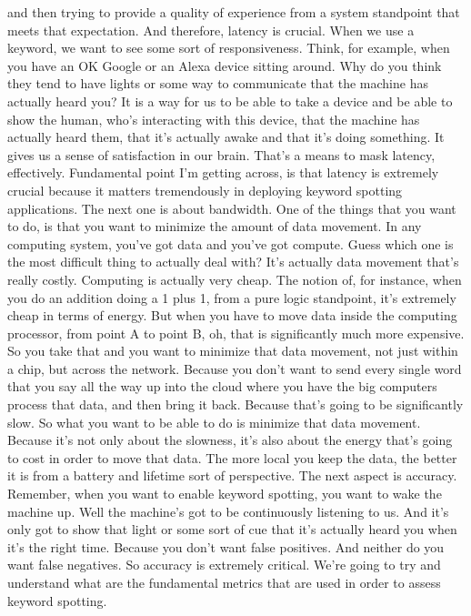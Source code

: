 and then trying to provide a quality of experience
from a system standpoint that meets that expectation.
And therefore, latency is crucial.
When we use a keyword, we want to see some sort of responsiveness.
Think, for example, when you have an OK Google or an Alexa device sitting around.
Why do you think they tend to have lights or some way
to communicate that the machine has actually heard you?
It is a way for us to be able to take a device
and be able to show the human, who's interacting with this device,
that the machine has actually heard them, that it's actually awake
and that it's doing something.
It gives us a sense of satisfaction in our brain.
That's a means to mask latency, effectively.
Fundamental point I'm getting across, is that latency is extremely crucial
because it matters tremendously in deploying
keyword spotting applications.
The next one is about bandwidth.
One of the things that you want to do, is
that you want to minimize the amount of data movement.
In any computing system, you've got data and you've got compute.
Guess which one is the most difficult thing to actually deal with?
It's actually data movement that's really costly.
Computing is actually very cheap.
The notion of, for instance, when you do an addition doing a 1 plus 1,
from a pure logic standpoint, it's extremely cheap in terms of energy.
But when you have to move data inside the computing processor, from point A
to point B, oh, that is significantly much more expensive.
So you take that and you want to minimize that data movement, not just
within a chip, but across the network.
Because you don't want to send every single word that you say all the way up
into the cloud where you have the big computers process that data,
and then bring it back.
Because that's going to be significantly slow.
So what you want to be able to do is minimize that data movement.
Because it's not only about the slowness,
it's also about the energy that's going to cost in order to move that data.
The more local you keep the data, the better
it is from a battery and lifetime sort of perspective.
The next aspect is accuracy.
Remember, when you want to enable keyword spotting,
you want to wake the machine up.
Well the machine's got to be continuously listening to us.
And it's only got to show that light or some sort of cue
that it's actually heard you when it's the right time.
Because you don't want false positives.
And neither do you want false negatives.
So accuracy is extremely critical.
We're going to try and understand what are
the fundamental metrics that are used in order to assess keyword spotting.
